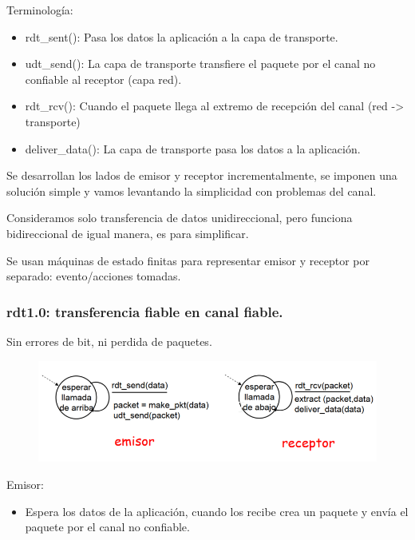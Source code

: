 \documentclass[12pt, twoside, openright]{report} %
\begin{document}
Terminología:

\begin{itemize}
	\item rdt\_sent(): Pasa los datos la aplicación a la capa de transporte.
	\item udt\_send(): La capa de transporte transfiere el paquete por el
	      canal no confiable al receptor (capa red).
	\item rdt\_rcv(): Cuando el paquete llega al extremo de recepción del
	      canal (red -\textgreater{} transporte)
	\item deliver\_data(): La capa de transporte pasa los datos a la
	      aplicación.
\end{itemize}

Se desarrollan los lados de emisor y receptor incrementalmente, se
imponen una solución simple y vamos levantando la simplicidad con
problemas del canal.

Consideramos solo transferencia de datos unidireccional, pero
funciona bidireccional de igual manera, es para simplificar.

Se usan máquinas de estado finitas para representar emisor y
receptor por separado: evento/acciones tomadas.

\subsubsection{rdt1.0: transferencia fiable en canal fiable.}

Sin errores de bit, ni perdida de paquetes.

\begin{figure}[H]
	{\includegraphics[scale=.45]{Untitled 10.png}}
\end{figure}

Emisor:

\begin{itemize}
	\item Espera los datos de la aplicación, cuando los recibe crea un
	      paquete y envía el paquete por el canal no confiable.
\end{itemize}
\end{document}
